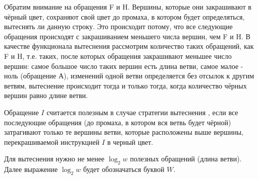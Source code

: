 \begin{enumerate}
Обратим внимание на обращения F и H. Вершины, которые они закрашивают в чёрный цвет, сохраняют свой цвет до промаха, в котором будет определяться, вытеснять ли данную строку. Это происходит потому, что все следующие обращения происходят с закрашиванием меньшего числа вершин, чем F и H. В качестве функционала вытеснения рассмотрим количество таких обращений, как F и H, т.е. таких, после которых обращения закрашивают меньшее число вершин: самое большое число таких вершин есть длина ветви, самое малое - ноль (обращение А), изменений одной ветви определяется без отсылок к другим ветвям, вытеснение происходит тогда и только тогда, когда количество чёрных вершин равно длине ветви.

%

\begin{utv}
Обращение $I$ считается полезным в случае стратегии вытеснения \PseudoLRU, если все последующие обращения (до промаха, в котором вся ветвь будет чёрной) затрагивают только те вершины ветви, которые расположены выше вершины, перекрашиваемой инструкцией $I$ в черный цвет.
\end{utv}

Для вытеснения нужно не менее $\log_2 w$ полезных обращений (длина ветви). Далее выражение $\log_2 w$ будет обозначаться буквой $W$.

%
%
%


\end{enumerate}
